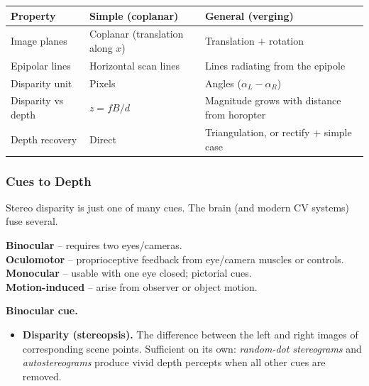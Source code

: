 \begin{center}
\renewcommand{\arraystretch}{1.3}
\begin{tabular}{@{} l l l @{}}
\toprule
\textbf{Property} & \textbf{Simple (coplanar)} & \textbf{General (verging)} \\
\midrule
Image planes & Coplanar (translation along $x$) & Translation $+$ rotation \\
Epipolar lines & Horizontal scan lines & Lines radiating from the epipole \\
Disparity unit & Pixels & Angles ($\alpha_L - \alpha_R$) \\
Disparity vs depth & $z = fB/d$ & Magnitude grows with distance from horopter \\
Depth recovery & Direct & Triangulation, or rectify $+$ simple case \\
\bottomrule
\end{tabular}
\end{center}

\bigseparator

\subsubsection{Cues to Depth}

Stereo disparity is just one of many cues. The brain (and modern CV systems) fuse several.

\begin{defbox}
\textbf{Binocular} -- requires two eyes/cameras. \\
\textbf{Oculomotor} -- proprioceptive feedback from eye/camera muscles or controls. \\
\textbf{Monocular} -- usable with one eye closed; pictorial cues. \\
\textbf{Motion-induced} -- arise from observer or object motion.
\end{defbox}

\separator

\textbf{Binocular cue.}
\begin{itemize}
  \item \textbf{Disparity (stereopsis).} The difference between the left and right images of corresponding scene points. Sufficient on its own: \emph{random-dot stereograms} and \emph{autostereograms} produce vivid depth percepts when all other cues are removed.
\end{itemize}

